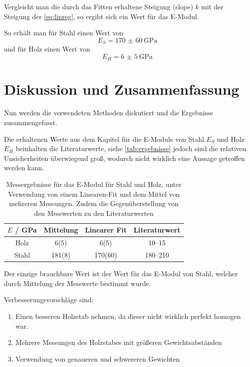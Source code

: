 \documentclass[11pt,ngerman]{scrartcl}
\begin{document}
Vergleicht man die durch das Fitten erhaltene Steigung (slope) $k$
mit der Steigung der \autoref{eq:linreg}, so ergibt sich ein Wert für
das E-Modul.

So erhält man für Stahl einen Wert von
\begin{equation}
	E_S = \SI{170(60)}{\GPa}
\end{equation}
und für Holz einen Wert von
\begin{equation}
	E_H = \SI{6(5)}{\GPa}
\end{equation}

\section{Diskussion und Zusammenfassung}
\label{sec:diskussion_zusammenfassung}

Nun werden die verwendeten Methoden diskutiert und die Ergebnisse
zusammengefasst.

Die erhaltenen Werte aus dem Kapitel 
für die E-Module von Stahl $E_S$ und Holz $E_H$ beinhalten
die Literaturwerte, siehe \autoref{tab:ergebnisse} jedoch sind die relativen Unsicherheiten
überwiegend groß, wodurch nicht wirklich eine Aussage getroffen werden kann.

\begin{table}[H]
	\centering
	\caption{Messergebnisse für das E-Modul für Stahl und Holz, unter Verwendung
		von einem Linearen-Fit und dem Mittel von mehreren Messungen. Zudem
		die Gegenüberstellung von den Messwerten zu den Literaturwerten}
	\label{tab:ergebnisse}
	\begin{tabular}{c|S|S|S}
		$E$ / GPa & {Mittelung} & {Linearer Fit} & {Literaturwert}                         \\ \hline
		Holz      & 6(5)        & 6(5)           & \numrange{10}{15} \cite{wikielasti2021} \\
		Stahl     & 181(8)      & 170(60)        & \numrange{180}{210} \cite{Ahrberg2011}  \\
	\end{tabular}
\end{table}

Der einzige brauchbare Wert ist der Wert für das E-Modul von Stahl,
welcher durch Mittelung der Messwerte bestimmt wurde.

Verbesserungsvorschläge sind:

\begin{enumerate}
	\item Einen besseren Holzstab nehmen, da dieser nicht wirklich
	      perfekt homogen war.
	\item Mehrere Messungen des Holzstabes mit größeren Gewichtsabständen
	\item Verwendung von genaueren und schwereren Gewichten
\end{enumerate}
\end{document}

